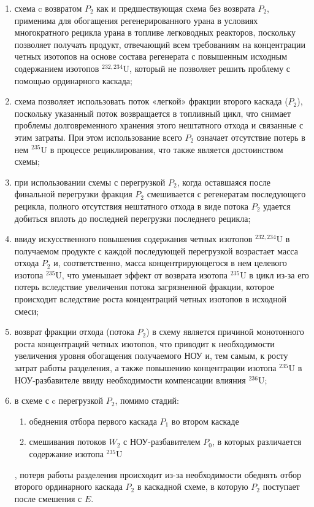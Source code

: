 \begin{enumerate}
    \item схема c возвратом $P_2$ как и предшествующая схема без возврата $P_2$, применима для обогащения регенерированного урана в условиях многократного рецикла урана в топливе легководных реакторов, поскольку позволяет получать продукт, отвечающий всем требованиям на концентрации четных изотопов на основе состава регенерата с повышенным исходным содержанием изотопов $^{232,234}$U, который не позволяет решить проблему с помощью ординарного каскада;
    \item схема позволяет использовать поток «легкой» фракции второго каскада ($P_2$), поскольку указанный поток возвращается в топливный цикл, что снимает проблемы долговременного хранения этого нештатного отхода и связанные с этим затраты. При этом использование всего $P_2$ означает отсутствие потерь в нем $^{235}$U в процессе рециклирования, что также является достоинством схемы;
    \item при использовании схемы с перегрузкой $P_2$, когда оставшаяся после финальной перегрузки фракция $P_2$ смешивается с регенератам последующего рецикла,  полного отсутствия нештатного отхода в виде потока $P_2$ удается добиться вплоть до последней перегрузки последнего рецикла;
    \item ввиду искусственного повышения содержания четных изотопов $^{232,234}$U в получаемом продукте с каждой последующей перегрузкой возрастает масса отхода  $P_2$ и, соответственно, масса концентрирующегося в нем целевого изотопа $^{235}$U, что уменьшает эффект от возврата изотопа $^{235}$U в цикл из-за его потерь вследствие увеличения потока загрязненной фракции, которое происходит вследствие роста концентраций четных изотопов в исходной смеси;
    \item возврат фракции отхода (потока $P_2$) в схему является причиной монотонного роста концентраций четных изотопов, что приводит к необходимости увеличения уровня обогащения получаемого НОУ и, тем самым, к росту затрат работы разделения, а также повышению концентрации изотопа $^{235}$U в НОУ-разбавителе ввиду необходимости компенсации влияния $^{236}$U;
    \item в схеме с c перегрузкой $P_2$, помимо стадий:
    \begin{enumerate}
        \item обеднения отбора первого каскада $P_1$ во втором каскаде
        \item смешивания потоков $W_2$ с НОУ-разбавителем $P_0$, в которых различается содержание изотопа $^{235}$U
    \end{enumerate}
    , потеря работы разделения происходит из-за необходимости обеднять отбор второго ординарного каскада $P_2$ в каскадной схеме, в которую $P_2$ поступает после смешения с $E$.
\end{enumerate}




